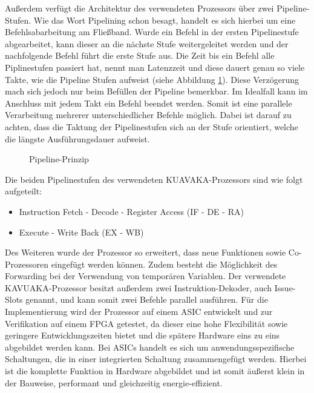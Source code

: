 Außerdem verfügt die Architektur des verwendeten Prozessors über zwei Pipeline-Stufen.
Wie das Wort Pipelining schon besagt, handelt es sich hierbei um eine Befehlsabarbeitung am Fließband. Wurde ein Befehl in der ersten Pipelinestufe abgearbeitet, kann dieser an die nächste Stufe weitergeleitet werden und der nachfolgende Befehl führt die erste Stufe aus. Die Zeit bis ein Befehl alle Piplinestufen passiert hat, nennt man Latenzzeit und diese dauert genau so viele Takte, wie die Pipeline Stufen aufweist (siehe Abbildung \ref{fig:pipeline}). Diese Verzögerung mach sich jedoch nur beim Befüllen der Pipeline bemerkbar. Im Idealfall kann im Anschluss mit jedem Takt ein Befehl beendet werden. Somit ist eine parallele Verarbeitung mehrerer unterschiedlicher Befehle möglich. Dabei ist darauf zu achten, dass die Taktung der Pipelinestufen sich an der Stufe orientiert, welche die längste Ausführungsdauer aufweist. \cite[Seite 204]{wust2010mikroprozessortechnik}
	\begin{figure}[H] 
		\centering
		
		\caption{Pipeline-Prinzip}
		\label{fig:pipeline}
	\end{figure}
\newpage
Die beiden Pipelinestufen des verwendeten KUAVAKA-Prozessors sind wie folgt aufgeteilt:
\begin{itemize}
	\item[1.] Instruction Fetch - Decode - Register Access (IF - DE - RA) 
	\item[2.] Execute - Write Back (EX - WB)
\end{itemize}

Des Weiteren wurde der Prozessor so erweitert, dass neue Funktionen sowie Co-Prozessoren eingefügt werden können. Zudem besteht die Möglichkeit des Forwarding bei der Verwendung von temporären Variablen.
Der verwendete KAVUAKA-Prozessor besitzt außerdem zwei Instruktion-Dekoder, auch Issue-Slots genannt, und kann somit zwei Befehle parallel ausführen.
Für die Implementierung wird der Prozessor auf einem ASIC entwickelt und zur Verifikation auf einem FPGA getestet, da dieser eine hohe Flexibilität sowie geringere Entwicklungszeiten bietet und die spätere Hardware eins zu eins abgebildet werden kann.\cite{lukasglitches2017}
Bei ASICs handelt es sich um anwendungsspezifische Schaltungen, die in einer integrierten Schaltung zusammengefügt werden. Hierbei ist die komplette Funktion in Hardware abgebildet und ist somit äußerst klein in der Bauweise, performant und gleichzeitig energie-effizient.


\newpage

